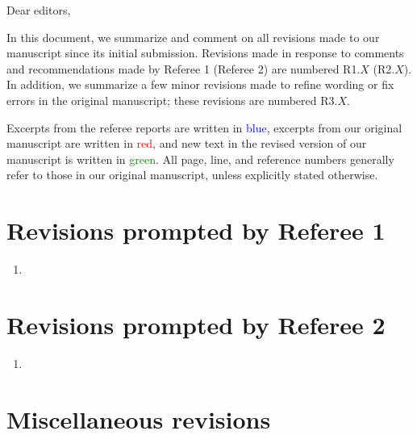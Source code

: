 \documentclass[preprint]{revtex4-1}
\newcommand{\1}{\mathds{1}}
\newcommand{\blue}[1]{\textcolor{blue}{#1}}
\newcommand{\red}[1]{\textcolor{red}{#1}}
\newcommand{\green}[1]{\textcolor{green}{#1}}
\begin{document}
Dear editors,

In this document, we summarize and comment on all revisions made to
our manuscript since its initial submission.  Revisions made in
response to comments and recommendations made by Referee 1 (Referee 2)
are numbered R1.$X$ (R2.$X$).  In addition, we summarize a few minor
revisions made to refine wording or fix errors in the original
manuscript; these revisions are numbered R3.$X$.

Excerpts from the referee reports are written in \blue{blue}, excerpts
from our original manuscript are written in \red{red}, and new text in
the revised version of our manuscript is written in \green{green}.
All page, line, and reference numbers generally refer to those in our
original manuscript, unless explicitly stated otherwise.


\section*{Revisions prompted by Referee 1}

\begin{enumerate}[label=(R1.\arabic*)]
\item
\end{enumerate}


\section*{Revisions prompted by Referee 2}

\begin{enumerate}[label=(R2.\arabic*)]
\item
\end{enumerate}


\section*{Miscellaneous revisions}
\end{document}
